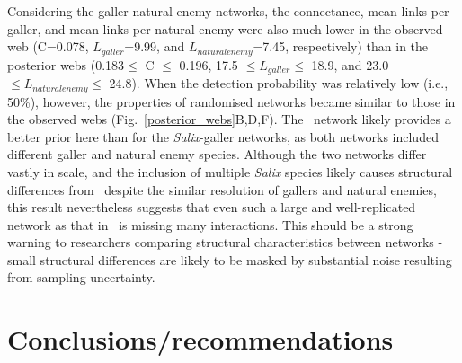 \documentclass[12pt]{article}
\begin{document}
\begin{spacing}{2.0}
    Considering the galler-natural enemy networks, the connectance, mean links per galler, and mean links per natural enemy were also much lower in the observed web (C=0.078, $L_{galler}$=9.99, and $L_{natural enemy}$=7.45, respectively) than in the posterior webs (0.183$\leq$ C $\leq$ 0.196, 17.5 $\leq L_{galler} \leq$ 18.9, and 23.0 $\leq L_{natural enemy} \leq$ 24.8). When the detection probability was relatively low (i.e., 50\%), however, the properties of randomised networks became similar to those in the observed webs (Fig.~\ref{posterior_webs}B,D,F). The~\citet{Barbour2016} network likely provides a better prior here than for the \emph{Salix}-galler networks, as both networks included different galler and natural enemy species. Although the two networks differ vastly in scale, and the inclusion of multiple \emph{Salix} species likely causes structural differences from~\citet{Barbour2016} despite the similar resolution of gallers and natural enemies, this result nevertheless suggests that even such a large and well-replicated network as that in~\citet{Kopelke2017} is missing many interactions. This should be a strong warning to researchers comparing structural characteristics between networks - small structural differences are likely to be masked by substantial noise resulting from sampling uncertainty.


\section*{Conclusions/recommendations}


\end{spacing}
\end{document}
